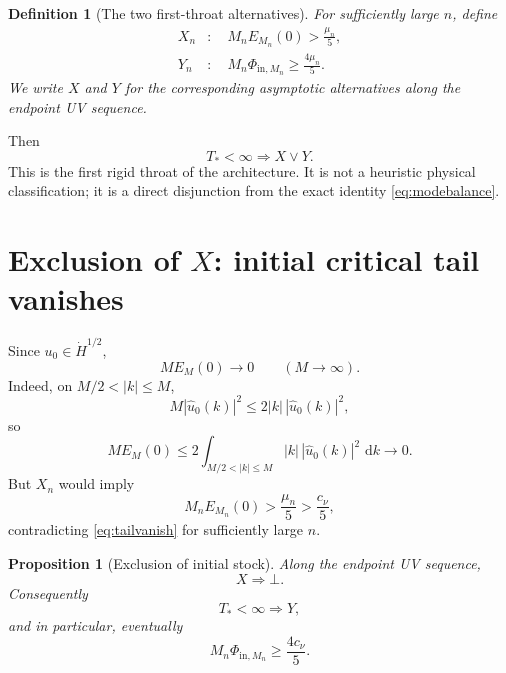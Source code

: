 \documentclass[11pt]{article}
\newtheorem{proposition}[theorem]{Proposition}
\newtheorem{definition}[theorem]{Definition}
\newcommand{\dd}{\,\mathrm d}
\newcommand{\Hdot}{\dot H}
\begin{document}
\begin{definition}[The two first-throat alternatives]
For sufficiently large $n$, define
\begin{align}
X_n&:\quad
M_nE_{M_n}(0)>\frac{\mu_n}{5},\label{eq:defX}\\
Y_n&:\quad
M_n\Phi_{\mathrm{in},M_n}\ge\frac{4\mu_n}{5}.
\label{eq:defY}
\end{align}
We write $X$ and $Y$ for the corresponding asymptotic alternatives along the endpoint UV sequence.
\end{definition}

Then
\begin{equation}\label{eq:TtoXY}
\boxed{
T_*<\infty\Longrightarrow X\vee Y.
}
\end{equation}
This is the first rigid throat of the architecture.  It is not a heuristic physical classification; it is a direct disjunction from the exact identity \eqref{eq:modebalance}.

\section{Exclusion of $X$: initial critical tail vanishes}

Since $u_0\in\Hdot^{1/2}$,
\begin{equation}\label{eq:tailvanish}
M E_M(0)\longrightarrow0
\qquad (M\to\infty).
\end{equation}
Indeed, on $M/2<|k|\le M$,
\[
M|\widehat u_0(k)|^2
\le2|k|\,|\widehat u_0(k)|^2,
\]
so
\[
M E_M(0)
\le
2\int_{M/2<|k|\le M}
|k|\,|\widehat u_0(k)|^2\,\dd k
\to0.
\]
But $X_n$ would imply
\[
M_nE_{M_n}(0)
>\frac{\mu_n}{5}
>\frac{c_\nu}{5},
\]
contradicting \eqref{eq:tailvanish} for sufficiently large $n$.

\begin{proposition}[Exclusion of initial stock]\label{prop:Xbot}
Along the endpoint UV sequence,
\begin{equation}\label{eq:Xbot}
\boxed{X\Longrightarrow\bot.}
\end{equation}
Consequently
\begin{equation}\label{eq:TtoY}
\boxed{
T_*<\infty\Longrightarrow Y,
}
\end{equation}
and in particular, eventually
\begin{equation}\label{eq:Yquantum}
\boxed{
M_n\Phi_{\mathrm{in},M_n}
\ge\frac{4c_\nu}{5}.
}
\end{equation}
\end{proposition}
\end{document}
